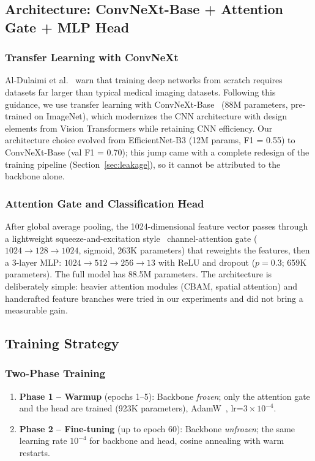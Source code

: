 \documentclass[twocolumn,a4paper]{article}
\begin{document}
\subsection{Architecture: ConvNeXt-Base + Attention Gate + MLP Head}

\subsubsection{Transfer Learning with ConvNeXt}

Al-Dulaimi et al.~\cite{aldulaimi2018} warn that training deep networks from scratch requires datasets far larger than typical medical imaging datasets. Following this guidance, we use transfer learning with ConvNeXt-Base~\cite{liu2022convnext} (88M parameters, pre-trained on ImageNet), which modernizes the CNN architecture with design elements from Vision Transformers while retaining CNN efficiency. Our architecture choice evolved from EfficientNet-B3 (12M params, F1 = 0.55) to ConvNeXt-Base (val F1 = 0.70); this jump came with a complete redesign of the training pipeline (Section~\ref{sec:leakage}), so it cannot be attributed to the backbone alone.

\subsubsection{Attention Gate and Classification Head}

After global average pooling, the 1024-dimensional feature vector passes through a lightweight squeeze-and-excitation style~\cite{hu2018squeeze} channel-attention gate ($1024 \to 128 \to 1024$, sigmoid, 263K parameters) that reweights the features, then a 3-layer MLP: $1024 \to 512 \to 256 \to 13$ with ReLU and dropout ($p=0.3$; 659K parameters). The full model has 88.5M parameters. The architecture is deliberately simple: heavier attention modules (CBAM, spatial attention) and handcrafted feature branches were tried in our experiments and did not bring a measurable gain.

\subsection{Training Strategy}

\subsubsection{Two-Phase Training}

\begin{enumerate}
    \item \textbf{Phase 1 -- Warmup} (epochs 1--5): Backbone \textit{frozen}; only the attention gate and the head are trained (923K parameters), AdamW~\cite{loshchilov2019decoupled}, lr=$3\times10^{-4}$.
    \item \textbf{Phase 2 -- Fine-tuning} (up to epoch 60): Backbone \textit{unfrozen}; the same learning rate $10^{-4}$ for backbone and head, cosine annealing with warm restarts.
\end{enumerate}
\end{document}
